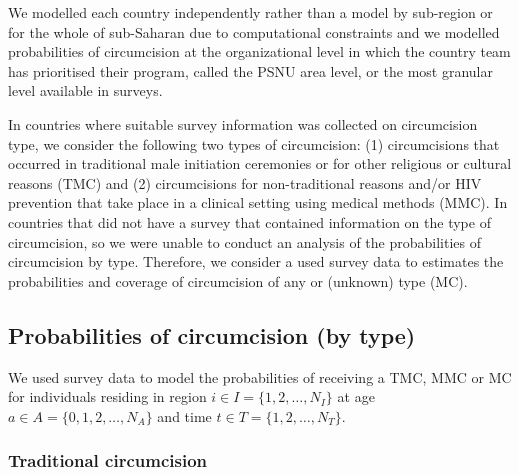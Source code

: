 \documentclass{article}
\begin{document}
\begin{appendix}
We modelled each country independently rather than a model by sub-region or for the whole of sub-Saharan due to computational constraints and we modelled probabilities of circumcision at the organizational level in which the country team has prioritised their program, called the PSNU area level, or the most granular level available in surveys. 

In countries where suitable survey information was collected on circumcision type, we consider the following two types of circumcision: (1) circumcisions that occurred in traditional male initiation ceremonies or for other religious or cultural reasons (TMC) and (2) circumcisions for non-traditional reasons and/or HIV prevention that take place in a clinical setting using medical methods (MMC). In countries that did not have a survey that contained information on the type of circumcision, so we were unable to conduct an analysis of the probabilities of circumcision by type. Therefore, we consider a used survey data to estimates the probabilities and coverage of circumcision of any or (unknown) type (MC). 


\subsection{Probabilities of circumcision (by type)}
\label{sec::bytype}


We used survey data to model the probabilities of receiving a TMC, MMC or MC for individuals residing in region $i \in I = \{1, 2, \ldots, N_I\}$ at age $a \in A = \{0, 1, 2, \ldots, N_A\}$ and time $t \in T = \{1, 2, \ldots, N_T\}$. 


\subsubsection*{Traditional circumcision}



\end{appendix}
\end{document}
